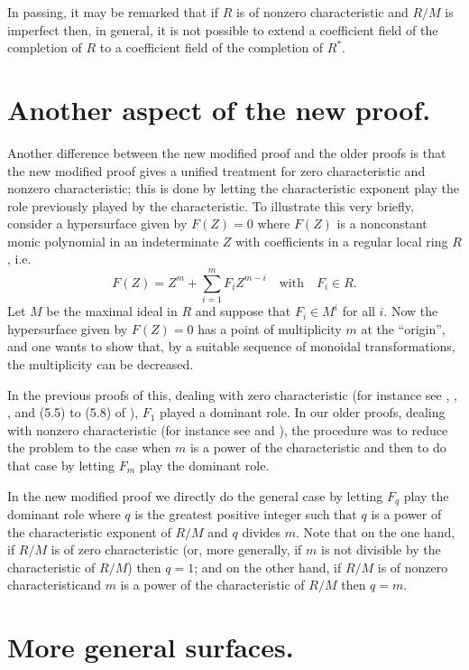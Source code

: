 In passing, it may be remarked that if $R$ is of nonzero characteristic and $R/M$ is imperfect then, in general, it is not possible to extend a coefficient field of the completion of $R$ to a coefficient field of the completion of $R^{*}$.

\section{Another aspect of the new proof.}\label{art01-sec4}

Another difference between the new modified proof and the older proofs is that the new modified proof gives a unified treatment for zero characteristic and nonzero characteristic; this is done by letting the characteristic exponent play the role previously played by the characteristic. To illustrate this very briefly, consider a hypersurface given by $F(Z)=0$ where $F(Z)$ is a nonconstant monic polynomial in an indeterminate $Z$ with coefficients in a regular local ring $R$, i.e.
$$
F(Z)=Z^{m}+\sum\limits^{m}_{i=1}F_{i}Z^{m-i}\quad\text{with}\quad F_{i}\in R.
$$
Let $M$ be the maximal ideal in $R$ and suppose that $F_{i}\in M^{i}$ for all $i$. Now the hypersurface given by $F(Z)=0$ has a point of multiplicity $m$ at the ``origin'', and one wants to show that, by a suitable sequence of monoidal transformations, the multiplicity can be decreased.

In the previous proofs of this, dealing with zero characteristic (for instance see \cite{art01-key16}, \cite{art01-key18}, \cite{art01-key12}, and (5.5) to (5.8) of \cite{art01-key10}), $F_{1}$ played a dominant role. In our older proofs, dealing with nonzero characteristic (for instance see \cite{art01-key9} and \cite{art01-key11}), the procedure was to reduce the problem to the case when $m$ is a power of the characteristic and then to do that case by letting $F_{m}$ play the dominant role.

In the new modified proof we directly do the general case by letting $F_{q}$ play the dominant role where $q$ is the greatest positive integer such that $q$ is a power of the characteristic exponent of $R/M$ and $q$ divides $m$. Note that on the one hand, if $R/M$ is of zero characteristic (or, more generally, if $m$ is not divisible by the characteristic of $R/M$) then $q=1$; and on the other hand, if $R/M$ is of nonzero characteristic\pageoriginale and $m$ is a power of the characteristic of $R/M$ then $q=m$.

\section{More general surfaces.}\label{art01-sec5}

